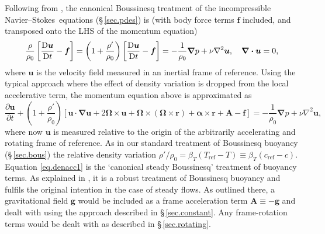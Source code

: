 \documentclass[11pt]{report}
\newcommand\NavSto{Navier--Stokes}
\begin{document}
Following from \citet{blss21}, the canonical Boussinesq treatment of
the incompressible \NavSto\ equations (\S\,\ref{sec.pdes}) is
(with body force terms $\bm{f}$ included, and transposed onto the LHS
of the momentum equation)
\begin{equation}
  \frac{\rho}{\rho_0}\left[\frac{\mathrm{D}\bm{u}}{\mathrm{D} t}-\bm{f}\right] = \left(1 +
  \frac{\rho'}{\rho_0}\right)\left[\frac{\mathrm{D}\bm{u}}{\mathrm{D} t}-\bm{f}\right]=
  -\frac{1}{\rho_0}\bm{\nabla}p+\nu\nabla^2\bm{u}, \quad \bm{\nabla\cdot u}=0,
\label{eq.full}
\end{equation}
where $\bm{u}$ is the velocity field measured in an inertial frame of
reference.  Using the typical approach where the effect of density
variation is dropped from the local accelerative term, the momentum
equation above is approximated as
\begin{equation}
  \frac{\partial\bm{u}}{\partial t} +
  \left(1+\frac{\rho'}{\rho_0}\right)\left[\bm{u\cdot\nabla u} +
   2\bm{\Omega}\!\times\!\bm{u} + \bm{\Omega}\!\times\!(\bm{\Omega}\!\times\!\bm{r}) +
  \bm{\alpha}\!\times\!\bm{r} + \bm{A} -\bm{f}\right]
  =   -\frac{1}{\rho_0}\bm{\nabla}p+\nu\nabla^2\bm{u},
\label{eq.denacc1}  
\end{equation}
where now $\bm{u}$ is measured relative to the origin of the
arbitrarily accelerating and rotating frame of reference.  As in our
standard treatment of Boussinesq buoyancy (\S\,\ref{sec.bous}) the
relative density variation
$\rho'/\rho_0=\beta_T(T_\text{ref}-T)\equiv\beta_T(c_\text{ref}-c)$.
Equation \eqref{eq.denacc1} is the `canonical steady Boussinesq'
treatment of buoyancy terms.  As explained in \citeauthor{blss21}, it is a
robust treatment of Boussinesq buoyancy and fulfils the original
intention in the case of steady flows. As outlined there, a
gravitational field $\bm{g}$ would be included as a frame acceleration
term $\bm{A}\equiv-\bm{g}$ and dealt with using the approach described
in \S\,\ref{sec.constant}.  Any frame-rotation terms would be dealt
with as described in \S\,\ref{sec.rotating}.
\end{document}
